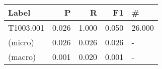 \begin{tabular}{lrrrl}
    \toprule
    Label     & P     & R     & F1    & \#     \\
    \midrule
    T1003.001 & 0.026 & 1.000 & 0.050 & 26.000 \\
    (micro)   & 0.026 & 0.026 & 0.026 & - \\
    (macro)   & 0.001 & 0.020 & 0.001 & -      \\
    \bottomrule
\end{tabular}
